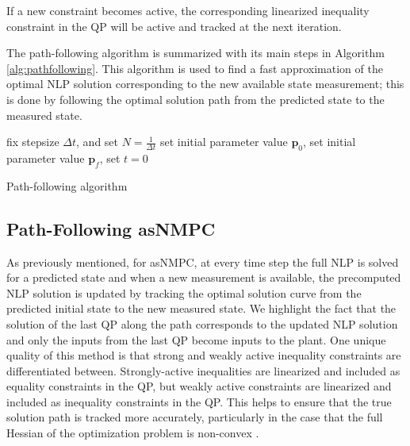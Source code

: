 If a new constraint becomes active, the corresponding linearized inequality constraint in the QP will be active and tracked at the next iteration.
\par
The path-following algorithm is summarized with its main steps in Algorithm \ref{alg:pathfollowing}.
This algorithm is used to find a fast approximation of the optimal NLP solution corresponding to the new available state measurement; this is done by following the optimal solution path from the predicted state to the measured state.\\
\begin{algorithm}[H]
\SetAlgoLined
{}
 fix stepsize $\Delta t$, and set $N=\frac{1}{\Delta t}$\;
 set initial parameter value $\boldsymbol{p}_0$,\;
 set initial parameter value $\boldsymbol{p}_f$,\;
 set $t=0$\;
 \caption{Path-following algorithm}
 \label{alg:pathfollowing}
\end{algorithm}
\subsection{Path-Following asNMPC}
As previously mentioned, for asNMPC, at every time step the full NLP is solved for a predicted state and when a new measurement is available, the precomputed NLP solution is updated by tracking the optimal solution curve from the predicted initial state to the new measured state.
We highlight the fact that the solution of the last QP along the path corresponds to the updated NLP solution and only the inputs from the last QP become inputs to the plant.
One unique quality of this method is that strong and weakly active inequality constraints are differentiated between.
Strongly-active inequalities are linearized and included as equality constraints in the QP, but weakly active constraints are linearized and included as inequality constraints in the QP.
This helps to ensure that the true solution path is tracked more accurately, particularly in the case that the full Hessian of the optimization problem is non-convex \cite{economic}.

